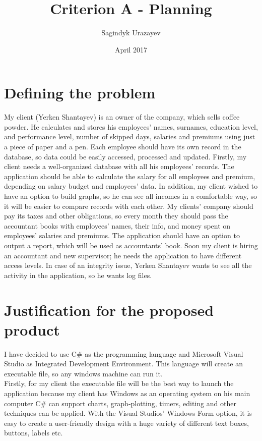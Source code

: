 \documentclass{article}
\author{Sagindyk Urazayev}
\title{Criterion A - Planning}
\date{April 2017}
\begin{document}
\maketitle

\section*{Defining the problem}

My client (Yerken Shantayev) is an owner of the company, which sells coffee powder. He calculates and stores his employees’ names, surnames, education level, and performance level, number of skipped days, salaries and premiums using just a piece of paper and a pen. Each employee should have its own record in the database, so data could be easily accessed, processed and updated. Firstly, my client needs a well-organized database with all his employees’ records. The application should be able to calculate the salary for all employees and premium, depending on salary budget and employees’ data. In addition, my client wished to have an option to build graphs, so he can see all incomes in a comfortable way, so it will be easier to compare records with each other. My clients’ company should pay its taxes and other obligations, so every month they should pass the accountant books with employees’ names, their info, and money spent on employees’ salaries and premiums. The application should have an option to output a report, which will be used as accountants’ book. Soon my client is hiring an accountant and new supervisor; he needs the application to have different access levels. In case of an integrity issue, Yerken Shantayev wants to see all the activity in the application, so he wants log files.

\section*{Justification for the proposed product}

I have decided to use C\# as the programming language and Microsoft Visual Studio as Integrated Development Environment. This language will create an executable file, so any windows machine can run it.\\

Firstly, for my client the executable file will be the best way to launch the application because my client has Windows as an operating system on his main computer C\# can support charts, graph-plotting, timers, editing and other techniques can be applied. With the Visual Studios’ Windows Form option, it is easy to create a user-friendly design with a huge variety of different text boxes, buttons, labels etc.\\
\end{document}

